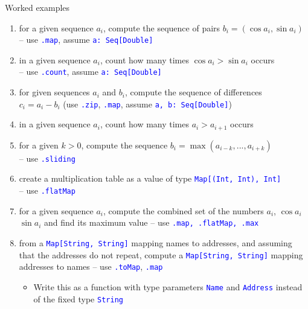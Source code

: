 \documentclass[english]{beamer}
\begin{document}
\begin{frame}{Worked examples}

\begin{enumerate}
\item for a given sequence $a_{i}$, compute the sequence of pairs $b_{i}=\left(\cos a_{i},\sin a_{i}\right)$
-- use \texttt{\textcolor{blue}{\footnotesize{}.map}}, assume \texttt{\textcolor{blue}{\footnotesize{}a:\ Seq{[}Double{]}}}{\footnotesize\par}
\item in a given sequence $a_{i}$, count how many times $\cos a_{i}>\sin a_{i}$
occurs\\
-- use \texttt{\textcolor{blue}{\footnotesize{}.count}}, assume \texttt{\textcolor{blue}{\footnotesize{}a:\ Seq{[}Double{]}}}{\footnotesize\par}
\item for given sequences $a_{i}$ and $b_{i}$, compute the sequence of
differences\\
 $c_{i}=a_{i}-b_{i}$ (use \texttt{\textcolor{blue}{\footnotesize{}.zip}},
\texttt{\textcolor{blue}{\footnotesize{}.map}}, assume \texttt{\textcolor{blue}{\footnotesize{}a,
b:\ Seq{[}Double{]}}})
\item in a given sequence $a_{i}$, count how many times $a_{i}>a_{i+1}$
occurs
\item for a given $k>0$, compute the sequence $b_{i}=\max(a_{i-k},...,a_{i+k})$\\
 -- use \texttt{\textcolor{blue}{\footnotesize{}.sliding}} 
\item create a multiplication table as a value of type \texttt{\textcolor{blue}{\footnotesize{}Map{[}(Int,
Int), Int{]}}}~\\
 -- use \texttt{\textcolor{blue}{\footnotesize{}.flatMap}}{\footnotesize\par}
\item for a given sequence $a_{i}$, compute the combined set of the numbers
$a_{i}$, $\cos a_{i}$ $\sin a_{i}$ and find its maximum value --
use \texttt{\textcolor{blue}{\footnotesize{}.map, .flatMap, .max}}{\footnotesize\par}
\item from a \texttt{\textcolor{blue}{\footnotesize{}Map{[}String, String{]}}}
mapping names to addresses, and assuming that the addresses do not
repeat, compute a \texttt{\textcolor{blue}{\footnotesize{}Map{[}String,
String{]}}} mapping addresses to names -- use \texttt{\textcolor{blue}{\footnotesize{}.toMap}},
\texttt{\textcolor{blue}{\footnotesize{}.map}}{\footnotesize\par}
\begin{itemize}
\item Write this as a function with type parameters \texttt{\textcolor{blue}{\footnotesize{}Name}}
and \texttt{\textcolor{blue}{\footnotesize{}Address}} instead of the
fixed type \texttt{\textcolor{blue}{\footnotesize{}String}}{\footnotesize\par}
\end{itemize}
\end{enumerate}
\end{frame}
\end{document}
